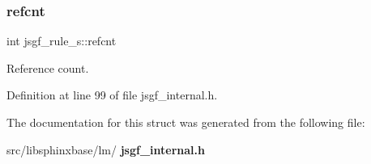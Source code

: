 \subsubsection{refcnt}
{\footnotesize\ttfamily int jsgf\+\_\+rule\+\_\+s\+::refcnt}



Reference count. 



Definition at line 99 of file jsgf\+\_\+internal.\+h.



The documentation for this struct was generated from the following file\+:\begin{DoxyCompactItemize}
\item 
src/libsphinxbase/lm/\textbf{ jsgf\+\_\+internal.\+h}\end{DoxyCompactItemize}
